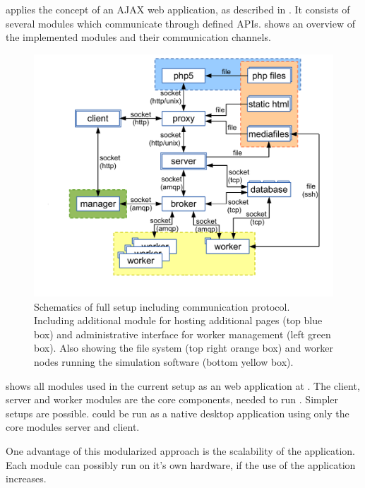 

\spl applies the concept of an AJAX web application, as described in .
It consists of several modules which communicate through defined APIs.
 shows an overview of the implemented modules and their communication channels.

\begin{figure}[htbp]
  \centering
    \includegraphics[width=\textwidth]{fig/whole_setup.pdf}
  \caption{Schematics of full \spl setup including communication protocol. Including additional module for hosting additional pages (top blue box) and administrative interface for worker management (left green box). Also showing the file system (top right orange box) and worker nodes running the simulation software (bottom yellow box).}
  \label{fig:whole_setup}
\end{figure}


 shows all modules used in the current setup as an web application at \splurl.
The client, server and worker modules are the core components, needed to run \spl.
Simpler setups are possible. \spl could be run as a native desktop application using only the core modules server and client.

One advantage of this modularized approach is the scalability of the application.
Each module can possibly run on it's own hardware, if the use of the application increases.

